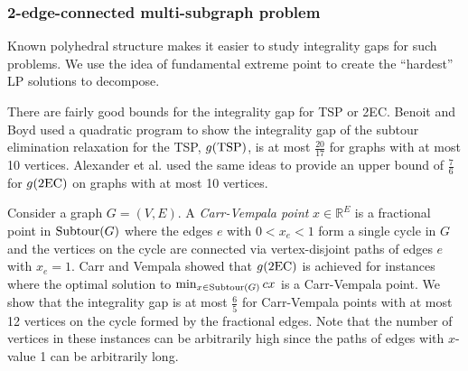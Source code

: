 \subsubsection{2-edge-connected multi-subgraph problem}
Known polyhedral structure makes it easier to study integrality gaps for such problems. We use the idea of fundamental extreme point \cite{carrravi,boydcarr,Carr2004} to create the ``hardest'' LP solutions to decompose.


There are fairly good bounds for the integrality gap for TSP or 2EC. Benoit and Boyd \cite{TSPcompute} used a quadratic program to show the integrality gap of the subtour elimination relaxation for the TSP, $g(\operatorname{{{TSP}}})$, is at most $\frac{20}{17}$ for graphs with at most 10 vertices. Alexander et al. \cite{alexander2006integrality} used the same ideas to provide an upper bound of $\frac{7}{6}$ for $g(\2ec)$ on graphs with at most 10 vertices. 

Consider a graph $G=(V,E)$. A \textit{Carr-Vempala point} $x\in \mathbb{R}^E$ is a fractional point in $\operatorname{{Subtour}}(G)$ where the edges $e$ with $0<x_e<1$ form a single cycle in $G$ and the vertices on the cycle are connected via vertex-disjoint paths of edges $e$ with $x_e =1$.  Carr and Vempala \cite{Carr2004} showed that $g(\2ec)$ is achieved for instances where the optimal solution to $\min_{x\in \operatorname{{Subtour}}(G)}cx$ is a Carr-Vempala point. We show that the integrality gap is at most $\frac{6}{5}$ for Carr-Vempala points with at most 12 vertices on the cycle formed by the fractional edges. Note that the number of vertices in these instances can be arbitrarily high since the paths of edges with $x$-value 1 can be arbitrarily long.




